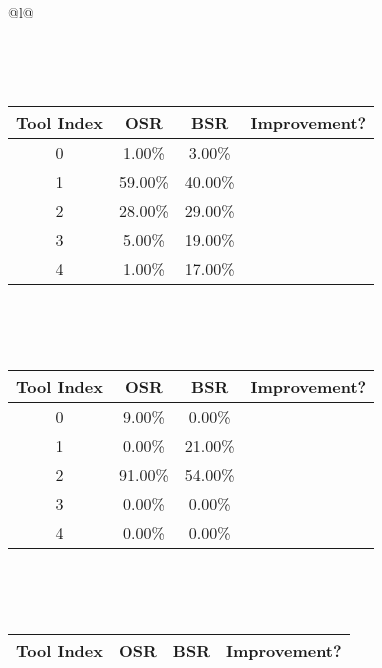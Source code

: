 \begin{longtable}{@{}l@{}}
\begin{minipage}{\textwidth}
\end{minipage}\\[2ex]
\begin{minipage}{\textwidth}
\centering\vspace{2ex}
\\[0.8ex]
\begin{tabular}{|c|c|c|c|} \hline
\textbf{Tool Index} & \textbf{OSR} & \textbf{ BSR} & \textbf{Improvement?} \\ \hline
0 & 1.00\% & 3.00\% & \textcolor{green}{\ding{51}} \\ \hline
1 & 59.00\% & 40.00\% & \textcolor{red}{\ding{55}} \\ \hline
2 & 28.00\% & 29.00\% & \textcolor{green}{\ding{51}} \\ \hline
3 & 5.00\% & 19.00\% & \textcolor{green}{\ding{51}} \\ \hline
4 & 1.00\% & 17.00\% & \textcolor{green}{\ding{51}} \\ \hline
\end{tabular}
\end{minipage}\\[2ex]
\begin{minipage}{\textwidth}
\centering\vspace{2ex}
\\[0.8ex]
\begin{tabular}{|c|c|c|c|} \hline
\textbf{Tool Index} & \textbf{OSR} & \textbf{ BSR} & \textbf{Improvement?} \\ \hline
0 & 9.00\% & 0.00\% & \textcolor{red}{\ding{55}} \\ \hline
1 & 0.00\% & 21.00\% & \textcolor{green}{\ding{51}} \\ \hline
2 & 91.00\% & 54.00\% & \textcolor{red}{\ding{55}} \\ \hline
3 & 0.00\% & 0.00\% & \textcolor{red}{\ding{55}} \\ \hline
4 & 0.00\% & 0.00\% & \textcolor{red}{\ding{55}} \\ \hline
\end{tabular}
\end{minipage}\\[2ex]
\begin{minipage}{\textwidth}
\centering\vspace{2ex}
\\[0.8ex]
\begin{tabular}{|c|c|c|c|} \hline
\textbf{Tool Index} & \textbf{OSR} & \textbf{ BSR} & \textbf{Improvement?} \\ \hline

\end{tabular}
\end{minipage}
\end{longtable}
